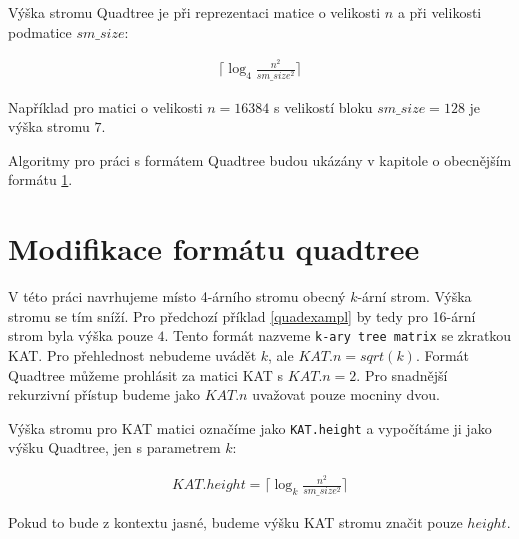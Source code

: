 Výška stromu Quadtree je při reprezentaci matice o velikosti $n$ a při velikosti podmatice $sm\_size$:

\label{quadtreeheight}
\begin{align}
\Bigg\lceil\log_{4}\frac{n^2}{sm\_size^2}\Bigg\rceil
\end{align}

\label{quadexampl}
Například pro matici o velikosti $n=16384$ s velikostí bloku $sm\_size=128$ je výška stromu $7$.

Algoritmy pro práci s formátem Quadtree budou ukázány v kapitole o obecnějším formátu \ref{katchapter}.


\section{Modifikace formátu quadtree}
\label{katchapter}

V této práci navrhujeme místo 4-árního stromu obecný $k$-ární strom. Výška stromu se tím sníží. Pro předchozí příklad \ref{quadexampl} by tedy pro 16-ární strom byla výška pouze $4$. Tento formát nazveme \texttt{k-ary tree matrix} se zkratkou KAT. Pro přehlednost nebudeme uvádět $k$, ale $KAT.n = sqrt(k)$. Formát Quadtree můžeme prohlásit za matici KAT s $KAT.n = 2$. Pro snadnější rekurzivní přístup budeme jako $KAT.n$ uvažovat pouze mocniny dvou.

Výška stromu pro KAT matici označíme jako \texttt{KAT.height} a vypočítáme ji jako výšku Quadtree, jen s parametrem $k$:

\label{katheight}
\begin{align}
KAT.height = \Bigg\lceil\log_{k}\frac{n^2}{sm\_size^2}\Bigg\rceil
\end{align}

Pokud to bude z kontextu jasné, budeme výšku KAT stromu značit pouze $height$.


